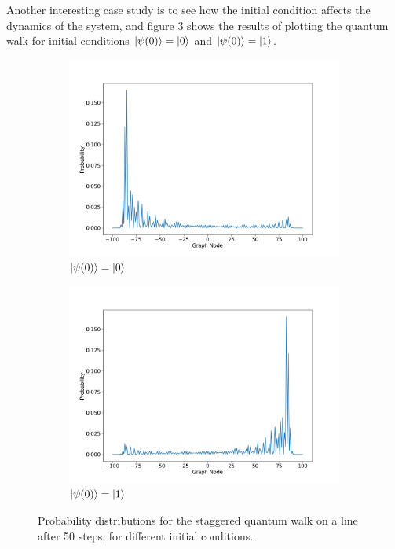 \documentclass[../../dissertation.tex]{subfiles}
\begin{document}
Another interesting case study is to see how the initial condition affects the
dynamics of the system, and figure \ref{fig:stagQW2InitCond} shows the results
of plotting the quantum walk for initial conditions  $\ket{\psi(0)}=\ket{0}$
and $\ket{\psi(0)}=\ket{1}$.
\begin{figure}[!h]
	\begin{subfigure}[h]{0.50\textwidth}
	\includegraphics[width=\linewidth]{img/StagQuantumWalk/stagqwSingle0.png}
	\caption{$\ket{\psi(0)}=\ket{0}$}\label{fig:fig6}
	\end{subfigure}\hfill
	\begin{subfigure}[h]{0.50\textwidth}
	\includegraphics[width=\linewidth]{img/StagQuantumWalk/stagqwSingle1.png}
	\caption{$\ket{\psi(0)}=\ket{1}$}\label{fig:fig7}
	\end{subfigure}\hfill
	\caption{Probability distributions for the staggered quantum walk on a line after 50 steps, for different initial conditions.}
	\label{fig:stagQW2InitCond}
\end{figure}
\end{document}

